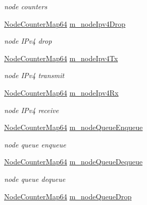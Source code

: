 \begin{DoxyCompactItemize}
\begin{DoxyCompactList}\small\item\em node counters \end{DoxyCompactList}\item 
\hyperlink{classns3_1_1AnimationInterface_a8bd3daf0ee1a2bbebced596061bd012b}{Node\+Counter\+Map64} \hyperlink{classns3_1_1AnimationInterface_a78ce3c4c559f22de95e35038e5dcbbed}{m\+\_\+node\+Ipv4\+Drop}
\begin{DoxyCompactList}\small\item\em node I\+Pv4 drop \end{DoxyCompactList}\item 
\hyperlink{classns3_1_1AnimationInterface_a8bd3daf0ee1a2bbebced596061bd012b}{Node\+Counter\+Map64} \hyperlink{classns3_1_1AnimationInterface_a20c6461b4020c35c0a004db0b910c8e5}{m\+\_\+node\+Ipv4\+Tx}
\begin{DoxyCompactList}\small\item\em node I\+Pv4 transmit \end{DoxyCompactList}\item 
\hyperlink{classns3_1_1AnimationInterface_a8bd3daf0ee1a2bbebced596061bd012b}{Node\+Counter\+Map64} \hyperlink{classns3_1_1AnimationInterface_a62b1c49cad16b618d8e81ca8bcfca862}{m\+\_\+node\+Ipv4\+Rx}
\begin{DoxyCompactList}\small\item\em node I\+Pv4 receive \end{DoxyCompactList}\item 
\hyperlink{classns3_1_1AnimationInterface_a8bd3daf0ee1a2bbebced596061bd012b}{Node\+Counter\+Map64} \hyperlink{classns3_1_1AnimationInterface_a72a132bd4a30c758b6893ac02a3494bb}{m\+\_\+node\+Queue\+Enqueue}
\begin{DoxyCompactList}\small\item\em node queue enqueue \end{DoxyCompactList}\item 
\hyperlink{classns3_1_1AnimationInterface_a8bd3daf0ee1a2bbebced596061bd012b}{Node\+Counter\+Map64} \hyperlink{classns3_1_1AnimationInterface_adcc9277a71a8b62c227c6dcca6eec41a}{m\+\_\+node\+Queue\+Dequeue}
\begin{DoxyCompactList}\small\item\em node queue dequeue \end{DoxyCompactList}\item 
\hyperlink{classns3_1_1AnimationInterface_a8bd3daf0ee1a2bbebced596061bd012b}{Node\+Counter\+Map64} \hyperlink{classns3_1_1AnimationInterface_a307c77004ad6aaf1ccf9a25a6812fbe1}{m\+\_\+node\+Queue\+Drop}

\end{DoxyCompactItemize}
